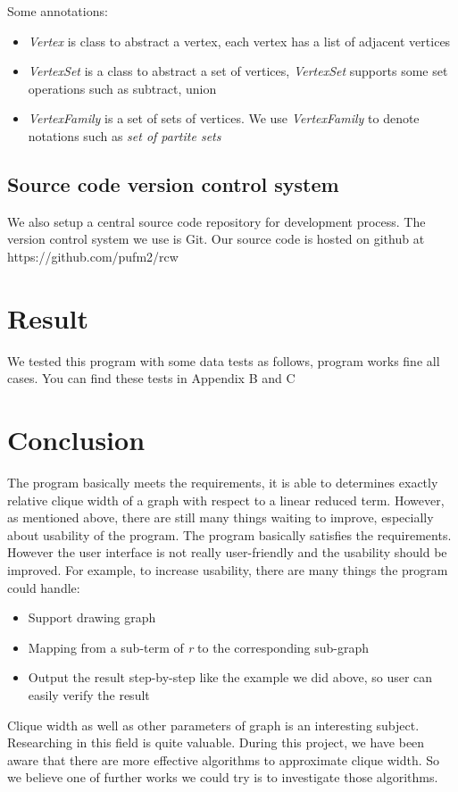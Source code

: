 \documentclass[a4paper, 12pt]{article}
\begin{document}
Some annotations:
\begin{itemize}
\item \textit {Vertex} is class to abstract a vertex, each vertex has a list of adjacent vertices
\item \textit {VertexSet} is a class to abstract a set of vertices, \textit {VertexSet} supports some set operations such as subtract, union
\item \textit {VertexFamily} is a set of sets of vertices. We use \textit {VertexFamily} to denote notations such as \textit {set of partite sets}
\end{itemize}

\subsection{Source code version control system}

We also setup a central source code repository for development process. The version control system we use is Git.\newline
Our source code is hosted on github at https://github.com/pufm2/rcw

\section {Result}
We tested this program with some data tests as follows, program works fine all cases. You can find these tests in Appendix B and C


\section {Conclusion}
The program basically meets the requirements, it is able to determines exactly relative clique width of a graph with respect to a linear reduced term. However, as mentioned above, there are still many things waiting to improve, especially about usability of the program.\newline\newline
The program basically satisfies the requirements. However the user interface is not really user-friendly and the usability should be improved. For example, to increase usability, there are many things the program could handle:
\begin{itemize}
\item Support drawing graph 
\item Mapping from a sub-term of \textit {r} to the corresponding sub-graph 
\item Output the result step-by-step like the example we did above, so user
can easily verify the result 
\end{itemize}
Clique width as well as other parameters of graph is an interesting subject. Researching in this field is quite valuable. During this project, we have been aware that there are more effective algorithms to approximate clique width. So we believe one of further works we could try is to investigate those algorithms.
\end{document}
